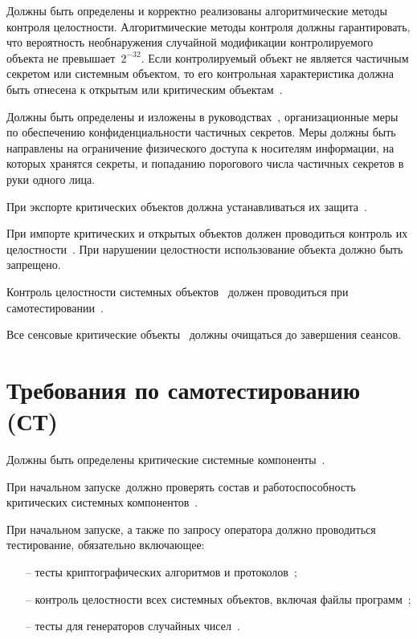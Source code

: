 \label{DPTAlgo}
Должны быть определены и корректно реализованы алгоритмические методы 
контроля целостности. 
Алгоритмические методы контроля должны гарантировать, 
что вероятность необнаружения случайной модификации контролируемого
объекта не превышает~$2^{-32}$. 
Если контролируемый объект не является частичным секретом или системным объектом, 
то его контрольная характеристика 
должна быть отнесена к открытым или критическим объектам~.

\label{DPTOrg}
Должны быть определены и изложены в руководствах~, 
организационные меры по обеспечению конфиденциальности частичных секретов.
Меры должны быть направлены на ограничение физического 
доступа к носителям информации, на которых хранятся секреты, 
и попаданию порогового числа частичных секретов в руки одного лица.

\label{DPTCritApply}
При экспорте критических объектов
должна устанавливаться их защита~.

\label{DPTPublicApply}
При импорте критических и открытых объектов
должен проводиться контроль их целостности~.
При нарушении целостности использование объекта должно быть запрещено.

\label{DPTSystemApply}
Контроль целостности системных объектов~ 
должен проводиться при самотестировании~.

\label{DPTZeroization}
Все сенсовые критические объекты~
должны очищаться до завершения сеансов.

\section{Требования по самотестированию (СТ)}

\label{CSCList}
Должны быть определены критические системные компоненты~\TOE.

\label{CSCTests}
При начальном запуске~\TOE должно проверять состав 
и работоспособность критических системных компонентов~.

\label{SelfTests}
При начальном запуске, а также по запросу оператора 
должно проводиться тестирование, 
обязательно включающее:
\begin{itemize}
\item[--]
тесты криптографических алгоритмов и протоколов~;
\item[--]
контроль целостности всех системных объектов, включая файлы 
программ~;
\item[--]
тесты для генераторов случайных чисел~.
\end{itemize}

